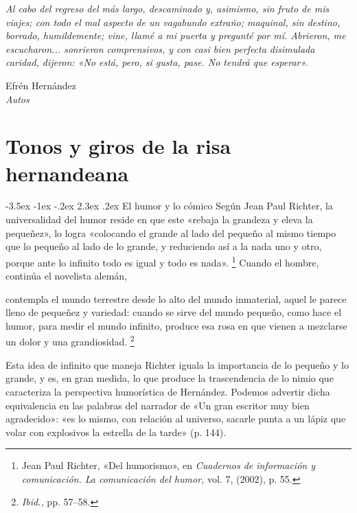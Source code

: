 \documentclass[14pt,twoside,final]{extbook} %
\makeatletter
\let\oldfootnote\footnote
\renewcommand\footnote[1]{%
\oldfootnote{\hspace{1mm}#1}}
\renewcommand\section{\@startsection {section}{1}{\z@}%
                                     {-3.5ex \@plus -1ex \@minus -.2ex}%
                                     {2.3ex \@plus .2ex}%
                                     {\normalfont\large\bfseries\sc}}
\makeatother
\begin{document}
\begin{flushright}
\begin{minipage}{7.5cm} %
\emph{Al cabo del regreso del más largo, descaminado y, asimismo, sin fruto de mis viajes; con todo el mal aspecto de un vagabundo extraño; maquinal, sin destino, borrado, humildemente; vine, llamé a mi puerta y pregunté por mí. Abrieron, me escucharon... sonrieron comprensivos, y con casi bien perfecta disimulada caridad, dijeron: «No está, pero, si gusta, pase. No tendrá que esperar».}
\begin{flushright}
Efrén Hernández \\ \emph{Autos}
\end{flushright}
\end{minipage}
\end{flushright}
\chapter[\textsc{Tonos y giros de la risa hernandeana}]{Tonos y giros de la risa hernandeana}\label{ch:tonos-y-giros-de-la-risa-hernandeana}
\BgThispage
\thispagestyle{empty}
\pagestyle{fancy}
\fancyhf{} %
\fancyhead[RO,LE]{\thepage}
\renewcommand{\headrulewidth}{0pt}
\section{El humor y lo cómico}\label{sec:el-humor-y-lo-comico}
Según Jean Paul Richter, la universalidad del humor reside en que este «rebaja la grandeza y eleva la pequeñez», lo logra «colocando el grande al lado del pequeño al mismo tiempo que lo pequeño al lado de lo grande, y reduciendo así a la nada uno y otro, porque ante lo infinito todo es igual y todo es nada».\footnote{Jean Paul Richter, «Del humorismo», en \emph{Cuadernos de información y comunicación. La comunicación del humor,} vol. 7, (2002), p. 55.} Cuando el hombre, continúa el novelista alemán,
\begin{quoting}
contempla el mundo terrestre desde lo alto del mundo inmaterial, aquel le parece lleno de pequeñez y variedad: cuando se sirve del mundo pequeño, como hace el humor, para medir el mundo infinito, produce esa rosa en que vienen a mezclarse un dolor y una grandiosidad.\footnote{\emph{Ibid.,} pp. 57--58.}
\end{quoting}
Esta idea de infinito que maneja Richter iguala la importancia de lo pequeño y lo grande, y es, en gran medida, lo que produce la trascendencia de lo nimio que caracteriza la perspectiva humorística de Hernández. Podemos advertir dicha equivalencia en las palabras del narrador de «Un gran escritor muy bien agradecido»: «es lo mismo, con relación al universo, sacarle punta a un lápiz que volar con explosivos la estrella de la tarde» (p. 144).
\end{document}
